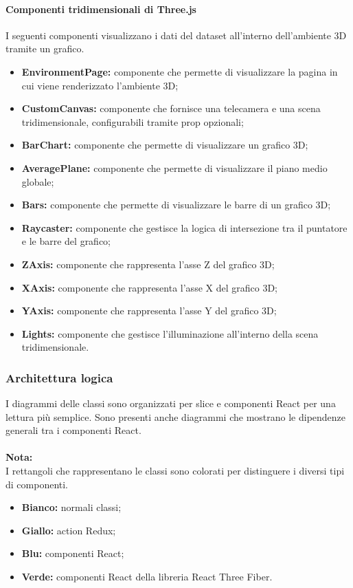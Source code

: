 \paragraph{Componenti tridimensionali di Three.js}
I seguenti componenti visualizzano i dati del dataset all'interno dell'ambiente
3D tramite un grafico.
\begin{itemize}
      \item \textbf{EnvironmentPage:} componente che permette di visualizzare la pagina in cui viene renderizzato l'ambiente 3D;
      \item \textbf{CustomCanvas:} componente che fornisce una telecamera e una scena tridimensionale, configurabili tramite prop opzionali;
      \item \textbf{BarChart:} componente che permette di visualizzare un grafico 3D;
      \item \textbf{AveragePlane:} componente che permette di visualizzare il piano medio globale;
      \item \textbf{Bars:} componente che permette di visualizzare le barre di un grafico 3D;
      \item \textbf{Raycaster:} componente che gestisce la logica di intersezione tra il puntatore e le barre del grafico;
      \item \textbf{ZAxis:} componente che rappresenta l'asse Z del grafico 3D;
      \item \textbf{XAxis:} componente che rappresenta l'asse X del grafico 3D;
      \item \textbf{YAxis:} componente che rappresenta l'asse Y del grafico 3D;
      \item \textbf{Lights:} componente che gestisce l'illuminazione all'interno della scena tridimensionale.
\end{itemize}

\pagebreak

\subsubsection{Architettura logica}
I diagrammi delle classi sono organizzati per slice e componenti React per una
lettura più semplice. Sono presenti anche diagrammi che mostrano le dipendenze
generali tra i componenti React.\\\\ \textbf{Nota:}\\ I rettangoli che
rappresentano le classi sono colorati per distinguere i diversi tipi di
componenti.
\begin{itemize}
      \item \textbf{Bianco:} normali classi;
      \item \textbf{Giallo:} action Redux;
      \item \textbf{Blu:} componenti React;
      \item \textbf{Verde:} componenti React della libreria React Three Fiber.
\end{itemize}

